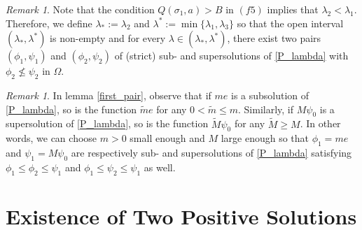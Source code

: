 \documentclass[reqno,oneside]{amsart}
\theoremstyle{definition}
\theoremstyle{remark}
\newtheorem{remark}[theorem]{Remark}
\numberwithin{equation}{section}
\newcommand{\la} {\lambda}
\newcommand{\Om} {\Omega}
\newcommand{\si}{\sigma}
\begin{document}
\begin{remark}\label{region_multiplicity}
    Note that the condition $Q(\si_1,a)>B$ in $(f5)$ implies that $\la_2 < \la_1$. Therefore, we define $\la_* := \la_2$ and $\la^* := \min \{ \la_1, \la_3\}$ so that the open interval $(\la_*, \la^*)$ is non-empty and for every $\la\in(\la_*, \la^*)$, there exist two pairs $(\phi_1,\psi_1)$ and $(\phi_2,\psi_2)$  of (strict) sub- and supersolutions of \eqref{P_lambda} with $\phi_2 \not\leq \psi_2$ in $\Om$.
\end{remark}

\begin{remark}
    In lemma \ref{first_pair}, observe that if $me$ is a subsolution of \eqref{P_lambda}, so is the function $\tilde{m} e$ for any $0<\tilde{m} \leq m$. Similarly, if $M\psi_0$ is a supersolution of \eqref{P_lambda}, so is the function $\tilde{M} \psi_0$ for any $\tilde{M} \geq M$. In other words, we can choose $m>0$ small enough and $M$ large enough so that $\phi_1=me$ and $\psi_1 = M\psi_0$ are respectively sub- and supersolutions of \eqref{P_lambda} satisfying $\phi_1 \leq \phi_2 \leq \psi_1$ and $\phi_1 \leq \psi_2 \leq \psi_1$ as well.
\end{remark}


\section{Existence of Two Positive Solutions}\label{section-multiplicity}
\end{document}
